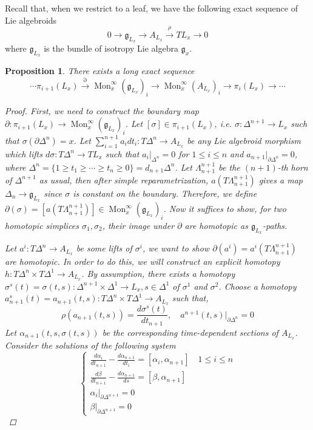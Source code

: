\documentclass[12pt]{amsart}
\newtheorem{prop}[thm]{Proposition}
\theoremstyle{definition}
\theoremstyle{remark}
\numberwithin{equation}{section}
\newcommand{\del}{\partial}
\renewcommand{\del}{\partial}
\newcommand{\1}{{\mathbb{1}}}
\newcommand{\g}{\mathfrak{g}}
\newcommand{\mon}{\operatorname{Mon}}
\begin{document}
Recall that, when we restrict to a leaf, we have the following exact sequence of Lie algebroids
\begin{equation*}
    0 \to \g_{L_x} \to A_{L_x} \stackrel{\rho}{\to} T L_x \to 0
\end{equation*}
where $\g_{L_x}$ is the bundle of isotropy Lie algebra $\g_x$.
\begin{prop}
There exists a long exact sequence
\begin{equation}                                   
    \cdots \pi_{i+1}(L_x) \stackrel{\del}{\to} \mon^{\infty}_x(\g_{L_x})_i \to \mon^{\infty}_x(A_{L_x})_i\to \pi_i(L_x) \to \cdots
\end{equation}

\begin{proof}
    First, we need to construct the boundary map $\del: \pi_{i+1}(L_x) \to \mon^{\infty}_x(\g_{L_x})_i$. Let $[\sigma] \in \pi_{i+1}(L_x)$, i.e. $\sigma: \Delta^{n+1} \to L_x$ such that $\sigma(\del \Delta^n) = x$. Let $\sum_{i=1}^{n+1} a_i dt_i: T\Delta^n \to A_{L_x}$ be any Lie algebroid morphism which lifts $d\sigma: T\Delta^n \to TL_x$ such that $a_i|_{\Delta^n} = 0$ for $1\le i \le n$ and $a_{n+1}|_{\del \Delta^n} = 0$, where $\Delta^n = \{1 \ge t_1\ge \cdots \ge t_n \ge 0\}= d_{n+1} \Delta^n$. Let $\Lambda^{n+1}_{n+1}$ be the $(n+1)$-th horn of $\Delta^{n+1}$ as usual, then after simple reparametrization, $a(T\Lambda^{n+1}_{n+1})$ gives a map $\Delta_n \to \g_{L_x}$ since $\sigma$ is constant on the boundary. Therefore, we define $\del(\sigma) = [a(T\Lambda^{n+1}_{n+1})] \in \mon^{\infty}_x(\g_{L_x})_i$. Now it suffices to show, for two homotopic simplices $\sigma_1, \sigma_2$, their image under $\del$ are homotopic as $\g_{L_x}$-paths.
    
    Let $a^i: T\Delta^n \to A_{L_x}$ be some lifts of $\sigma^i$, we want to show $\del(a^i) = a^i(T\Lambda^{n+1}_{n+1})$ are homotopic. In order to do this, we will construct an explicit homotopy $h: T\Delta^n \times T\Delta^1 \to A_{L_x}$. By assumption, there exists a homotopy $\sigma^s(t) = \sigma(t,s):\Delta^{n+1} \times \Delta^1 \to L_x, s\in \Delta^1$ of $\sigma^1$ and $\sigma^2$. Choose a homotopy $a^s_{n+1}(t)=a_{n+1}(t,s): T\Delta^n \times T\Delta^1 \to A_{L_x}$ such that, 
    $$
    \rho(a_{n+1}(t,s)) = \frac{d \sigma^s(t) }{d t_{n+1}}, \quad a^{n+1}(t,s)|_{\del \Delta^n} = 0 
    $$
    Let $\alpha_{n+1}(t,s, \sigma(t,s))$ be the corresponding time-dependent sections of $A_{L_x}$. Consider the solutions of the following system
    \begin{equation*}
        \begin{cases}
        \frac{d \alpha_i}{dt_{n+1}} - \frac{d \alpha_{n+1}}{dt_{i}} = [\alpha_i, \alpha_{n+1}] \quad 1\le i \le n\\
        \frac{d \beta}{dt_{n+1}} - \frac{d \alpha_{n+1}}{ds} = [\beta, \alpha_{n+1}]\\
        \alpha_i|_{\del \Delta^{n+1}} = 0\\
        \beta|_{\del \Delta^{n+1}} = 0
        

\end{cases}
\end{equation*}
\end{proof}
\end{prop}
\end{document}
